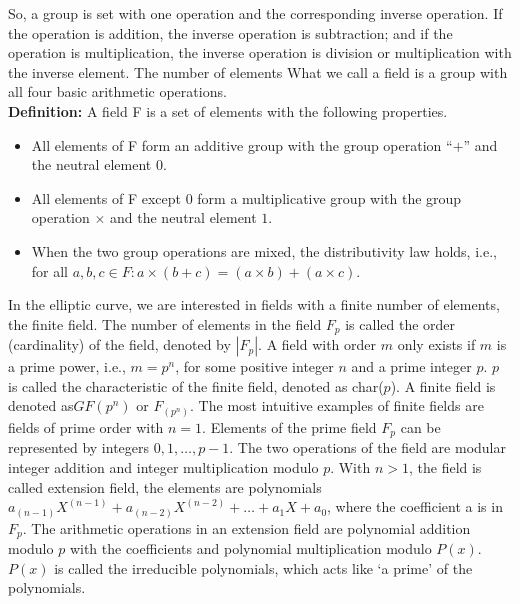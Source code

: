 So, a group is set with one operation and the corresponding inverse operation. If the operation is addition, the inverse operation is subtraction; and if the operation is multiplication, the inverse operation is division or multiplication with the inverse element. The number of elements What we call a field is a group with all four basic arithmetic operations.\\
\vspace{0.5cm} \textbf{Definition:} A field F is a set of elements with the following properties.\\
\begin{itemize}
\item All elements of F form an additive group with the group operation “$+$” and the neutral element $0$.\\
\item All elements of F except $0$ form a multiplicative group with the group operation $\times$ and the neutral element $1$.\\
\item When the two group operations are mixed, the distributivity law holds, i.e., for all $a, b, c \in F: a \times (b+c) = (a \times b) + (a \times c)$.\\
\end{itemize}  


In the elliptic curve, we are interested in fields with a finite number of elements, the finite field. The number of elements in the field $F_p$ is called the order (cardinality) of the field, denoted by $|F_p|$. A field with order $m$ only exists if $m$ is a prime power, i.e., $m = p^n$, for some positive integer $n$ and a prime integer $p$. $p$ is called the characteristic of the finite field, denoted as char($p$). A finite field is denoted as$ GF(p^n)$ or $F_(p^n)$. The most intuitive examples of finite fields are fields of prime order with $n = 1$. Elements of the prime field $F_p$ can be represented by integers $0, 1, …, p-1$. The two operations of the field are modular integer addition and integer multiplication modulo $p$. With $n > 1$, the field is called extension field, the elements are polynomials $a_(n-1)X^(n-1) + a_(n-2)X^(n-2) + … + a_1X + a_0$, where the coefficient a is in $F_p$. The arithmetic operations in an extension field are polynomial addition modulo $p$ with the coefficients and polynomial multiplication modulo $P(x)$. $P(x)$ is called the irreducible polynomials, which acts like ‘a prime’ of the polynomials.

